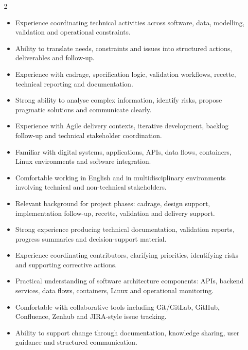 \documentclass[8pt,a4paper,ragged2e,withhyper]{altacv}
\begin{document}
\begin{paracol}{2}
\begin{itemize}
  \item Experience coordinating technical activities across software, data, modelling, validation and operational constraints.
  \item Ability to translate needs, constraints and issues into structured actions, deliverables and follow-up.
  \item Experience with cadrage, specification logic, validation workflows, recette, technical reporting and documentation.
  \item Strong ability to analyse complex information, identify risks, propose pragmatic solutions and communicate clearly.
  \item Experience with Agile delivery contexts, iterative development, backlog follow-up and technical stakeholder coordination.
  \item Familiar with digital systems, applications, APIs, data flows, containers, Linux environments and software integration.
  \item Comfortable working in English and in multidisciplinary environments involving technical and non-technical stakeholders.
\end{itemize}


\begin{itemize}
  \item Relevant background for project phases: cadrage, design support, implementation follow-up, recette, validation and delivery support.
  \item Strong experience producing technical documentation, validation reports, progress summaries and decision-support material.
  \item Experience coordinating contributors, clarifying priorities, identifying risks and supporting corrective actions.
  \item Practical understanding of software architecture components: APIs, backend services, data flows, containers, Linux and operational monitoring.
  \item Comfortable with collaborative tools including Git/GitLab, GitHub, Confluence, Zenhub and JIRA-style issue tracking.
  \item Ability to support change through documentation, knowledge sharing, user guidance and structured communication.
\end{itemize}



\end{paracol}
\end{document}
